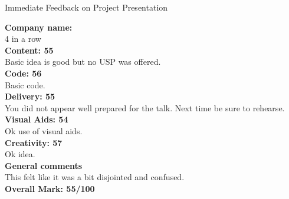 \documentclass{article}
\begin{document}
\begin{center}
\Huge{Immediate Feedback on Project Presentation}\\
\end{center}


\normalsize
\textbf{Company name:}\\

4 in a row\\

\textbf{Content: 55}\\

Basic idea is good but no USP was offered.\\

\textbf{Code: 56}\\

Basic code.\\

\textbf{Delivery: 55}\\

You did not appear well prepared for the talk.
Next time be sure to rehearse.\\

\textbf{Visual Aids: 54}\\

Ok use of visual aids.\\

\textbf{Creativity: 57}\\

Ok idea.\\

\textbf{General comments}\\

This felt like it was a bit disjointed and confused.\\

\textbf{Overall Mark: 55/100}
\end{document}
